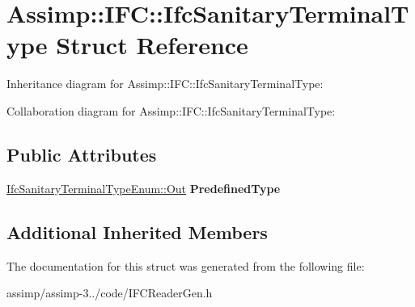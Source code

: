 \hypertarget{struct_assimp_1_1_i_f_c_1_1_ifc_sanitary_terminal_type}{\section{Assimp\+:\+:I\+F\+C\+:\+:Ifc\+Sanitary\+Terminal\+Type Struct Reference}
\label{struct_assimp_1_1_i_f_c_1_1_ifc_sanitary_terminal_type}
}


Inheritance diagram for Assimp\+:\+:I\+F\+C\+:\+:Ifc\+Sanitary\+Terminal\+Type\+:


Collaboration diagram for Assimp\+:\+:I\+F\+C\+:\+:Ifc\+Sanitary\+Terminal\+Type\+:
\subsection*{Public Attributes}
\begin{DoxyCompactItemize}
\item 
\hypertarget{struct_assimp_1_1_i_f_c_1_1_ifc_sanitary_terminal_type_a03516a9404ffe549e67d0cab3ae54650}{\hyperlink{classboost_1_1shared__ptr}{Ifc\+Sanitary\+Terminal\+Type\+Enum\+::\+Out} {\bfseries Predefined\+Type}}\label{struct_assimp_1_1_i_f_c_1_1_ifc_sanitary_terminal_type_a03516a9404ffe549e67d0cab3ae54650}

\end{DoxyCompactItemize}
\subsection*{Additional Inherited Members}


The documentation for this struct was generated from the following file\+:\begin{DoxyCompactItemize}
\item 
assimp/assimp-\/3../code/I\+F\+C\+Reader\+Gen.\+h\end{DoxyCompactItemize}
